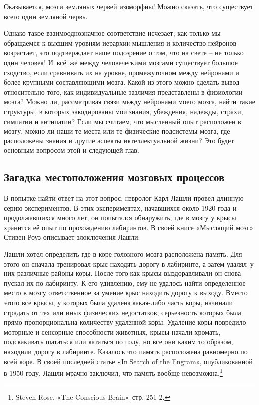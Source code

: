 \documentclass[../main.tex]{subfiles}
\begin{document}
Оказывается, мозги земляных червей изоморфны! Можно сказать, что существует всего один земляной червь.

Однако такое взаимооднозначное соответствие исчезает, как только мы обращаемся к высшим уровням иерархии мышления и количество нейронов возрастает, это подтверждает наше подозрение о том, что на свете \--- не только один человек! И~всё~же между человеческими мозгами существует большое сходство, если сравнивать их на уровне, промежуточном между нейронами и более крупными составляющими мозга. Какой из этого можно сделать вывод относительно того, как индивидуальные различия представлены в физиологии мозга? Можно ли, рассматривая связи между нейронами моего мозга, найти такие структуры, в которых закодированы мои знания, убеждения, надежды, страхи, симпатии и антипатии? Если мы считаем, что мысленный опыт расположен в мозгу, можно ли наши те места или те физические подсистемы мозга, где расположены знания и другие аспекты интеллектуальной жизни? Это будет основным вопросом этой и следующей глав.


\subsection{Загадка местоположения мозговых процессов}

В попытке найти ответ на этот вопрос, невролог Карл Лашли провел длинную серию экспериментов. В этих экспериментах, начавшихся около 1920 года и продолжавшихся много лет, он попытался обнаружить, где в мозгу у крысы хранится её опыт по прохождению лабиринтов. В своей книге «Мыслящий мозг» Стивен Роуз описывает злоключения Лашли:

Лашли хотел определить где в коре головного мозга расположена память. Для этого он сначала тренировал крыс находить дорогу в лабиринте, а затем удалял~у них различные районы коры. После того как крысы выздоравливали он снова пускал их по лабиринту. К его удивлению, ему не удалось найти определенное место в мозгу ответственное за умение крыс находить дорогу к выходу. Вместо этого все крысы, у которых была удалена какая-либо часть коры, начинали страдать от тех или иных физических недостатков, серьезность которых была прямо пропорциональна количеству удаленной коры. Удаление коры повредило моторные и сенсорные способности животных, крысы начали хромать, подскакивать шататься или кататься по полу, но все они каким то образом, находили дорогу в лабиринте. Казалось что память расположена равномерно по всей коре. В своей последней статье «In Search of the Engram», опубликованной в 1950 году, Лашли мрачно заключил, что память вообще невозможна.\footnote{Steven Rose, «The Conscious Brain», стр. 251-2.}
\end{document}
